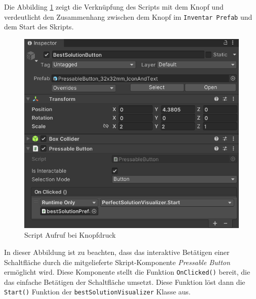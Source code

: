 Die Abbilding \ref{fig:ScrAuf} zeigt die Verknüpfung des Scripts mit dem Knopf und verdeutlicht den Zusammenhang zwischen
dem Knopf im \texttt{Inventar Prefab} und dem Start des Skripts.

\begin{figure}[H]
    \centering
    \includegraphics[scale=0.8]{images/perfSolBut}
    \caption{Script Aufruf bei Knopfdruck}
    \label{fig:ScrAuf}
\end{figure}

In dieser Abbildung ist zu beachten, dass das interaktive Betätigen einer Schaltfläche durch die mitgelieferte Skript-Komponente
\textit{Pressable Button} ermöglicht wird. Diese Komponente stellt die Funktion \texttt{OnClicked()} bereit, die das
einfache Betätigen der Schaltfläche umsetzt. Diese Funktion löst dann die \texttt{Start()} Funktion der \texttt{bestSolutionVisualizer}
Klasse aus.

